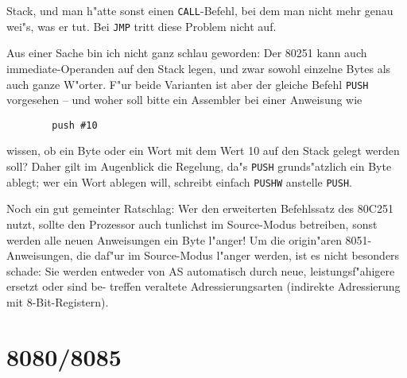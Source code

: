 \documentclass[12pt,a4paper,twoside]{report}
\newcommand{\tty}[1]{{\tt #1}}
\begin{document}
Stack, und man h"atte sonst einen \tty{CALL}-Befehl, bei dem man nicht
mehr genau wei"s, was er tut.  Bei \tty{JMP} tritt diese Problem nicht auf.
\par
Aus einer Sache bin ich nicht ganz schlau geworden: Der 80251 kann
auch immediate-Operanden auf den Stack legen, und zwar sowohl einzelne
Bytes als auch ganze W"orter.  F"ur beide Varianten ist aber der gleiche
Befehl \tty{PUSH} vorgesehen -- und woher soll bitte ein Assembler bei
einer Anweisung wie
\begin{verbatim}
        push #10
\end{verbatim}
wissen, ob ein Byte oder ein Wort mit dem Wert 10 auf den Stack gelegt
werden soll?  Daher gilt im Augenblick die Regelung, da"s \tty{PUSH}
grunds"atzlich ein Byte ablegt; wer ein Wort ablegen will, schreibt
einfach \tty{PUSHW} anstelle \tty{PUSH}.
\par
Noch ein gut gemeinter Ratschlag: Wer den erweiterten Befehlssatz des
80C251 nutzt, sollte den Prozessor auch tunlichst im Source-Modus
betreiben, sonst werden alle neuen Anweisungen ein Byte l"anger!  Um
die origin"aren 8051-Anweisungen, die daf"ur im Source-Modus l"anger
werden, ist es nicht besonders schade: Sie werden entweder von AS
automatisch durch neue, leistungsf"ahigere ersetzt oder sind be-
treffen veraltete Adressierungsarten (indirekte Adressierung mit
8-Bit-Registern).


\section{8080/8085}
\label{8080Spec}
\end{document}
